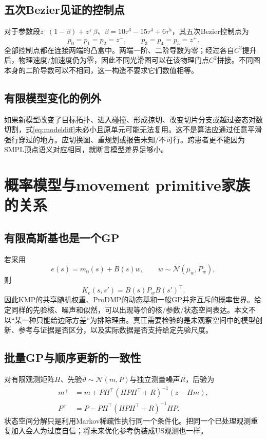 \documentclass[UTF8,11pt,a4paper,fontset=fandol]{ctexart}
\numberwithin{equation}{section}
\theoremstyle{definition}
\begin{document}
\subsection{五次Bezier见证的控制点}
对于参数段$z^-(1-\beta)+z^+\beta$、$\beta=10\tau^3-15\tau^4+6\tau^5$，其五次Bezier控制点为
\begin{equation}
 p_0=p_1=p_2=z^-,\qquad p_3=p_4=p_5=z^+.
\end{equation}
全部控制点都在连接两端的凸盒中。两端一阶、二阶导数为零；经过各自$C^2$提升后，物理速度/加速度仍为零，因此不同光滑图可以在该物理门点$C^2$拼接。不同图本身的二阶导数可以不相同，这一构造不要求它们数值相等。

\subsection{有限模型变化的例外}
如果新模型改变了目标拓扑、进入碰撞、形成掠切、改变切片分支或越过姿态对数切割，式\eqref{eq:modeldiff}未必小且原单元可能无法复用。这不是算法应通过任意平滑强行穿过的地方。应切换图、重规划或报告未知/不可行。跨患者更不能因为SMPL顶点语义对应相同，就断言模型差界足够小。

\section{概率模型与movement primitive家族的关系}
\subsection{有限高斯基也是一个GP}
若采用
\begin{equation}
 e(s)=m_0(s)+B(s)w,\qquad w\sim\mathcal N(\mu_w,P_w),
\end{equation}
则
\begin{equation}
 K_e(s,s')=B(s)P_wB(s')^\top.
\end{equation}
因此KMP的共享随机权重、ProDMP的动态基和一般GP并非互斥的概率世界。给定同样的先验核、噪声和似然，可以出现等价的核/参数/状态空间表达。本文不以“某一种只能给边际方差”为排除理由。真正需要检验的是未观察空间中的模型创新、参考与证据是否区分，以及实际数据是否支持给定先验尺度。

\subsection{批量GP与顺序更新的一致性}
对有限观测矩阵$H$、先验$\vartheta\sim\mathcal N(m,P)$与独立测量噪声$R$，后验为
\begin{align}
 m^+&=m+PH^\top(HPH^\top+R)^{-1}(z-Hm),\\
 P^+&=P-PH^\top(HPH^\top+R)^{-1}HP.
\end{align}
状态空间分解只是利用Markov稀疏性执行同一个条件化。把同一个已处理观测重复加入会人为过度自信；将未来优化参考伪装成US观测也一样。
\end{document}
